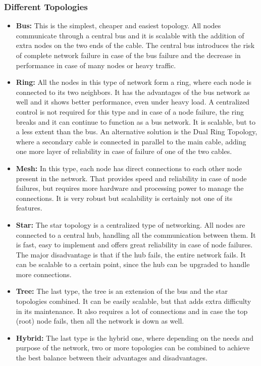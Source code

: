 \subsubsection{Different Topologies}
\begin{itemize}
\item \textbf{Bus:} This is the simplest, cheaper and easiest topology. All nodes communicate through a central bus and it is scalable with the addition of extra nodes on the two ends of the cable. The central bus introduces the risk of complete network failure in case of the bus failure and the decrease in performance in case of many nodes or heavy traffic.
\item \textbf{Ring:} All the nodes in this type of network form a ring, where each node is connected to its two neighbors. It has the advantages of the bus network as well and it shows better performance, even under heavy load. A centralized control is not required for this type and in case of a node failure, the ring breaks and it can continue to function as a bus network. It is scalable, but to a less extent than the bus. An alternative solution is the Dual Ring Topology, where a secondary cable is connected in parallel to the main cable, adding one more layer of reliability in case of failure of one of the two cables.
\item \textbf{Mesh:} In this type, each node has direct connections to each other node present in the network. That provides speed and reliability in case of node failures, but requires more hardware and processing power to manage the connections. It is very robust but scalability is certainly not one of its features.
\item \textbf{Star:} The star topology is a centralized type of networking. All nodes are connected to a central hub, handling all the communication between them. It is fast, easy to implement and offers great reliability in case of node failures. The major disadvantage is that if the hub fails, the entire network fails. It can be scalable to a certain point, since the hub can be upgraded to handle more connections.
\item \textbf{Tree:} The last type, the tree is an extension of the bus and the star topologies combined. It can be easily scalable, but that adds extra difficulty in its maintenance. It also requires a lot of connections and in case the top (root) node fails, then all the network is down as well.
\item \textbf{Hybrid:} The last type is the hybrid one, where depending on the needs and purpose of the network, two or more topologies can be combined to achieve the best balance between their advantages and disadvantages.
\end{itemize}

